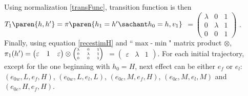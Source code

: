 Using normalization \ref{transFunc}, 
transition function is then 
$T_1 \paren{ h, h'} = \pi \paren{ h_1 = h' \sachant h_0 = h, v_1 }$ \tiny 
$=\begin{pmatrix} \lambda & 0 & 1 \\ 0 & \lambda & 1 \\ 0 & 0 & 1  \end{pmatrix}$ \normalsize.
Finally, using equation \ref{recestimH} 
and ``$\max$-$\min$" matrix product $\otimes$, 
$\pi_1(h') = \begin{pmatrix} \varepsilon & 1 & \varepsilon  \end{pmatrix}  
\otimes \tiny \begin{pmatrix} \lambda & 0 & 1 \\ 0 & \lambda & 1 \\ 0 & 0 & 1 \end{pmatrix}$ \normalsize $ 
= \begin{pmatrix} \varepsilon & \lambda & 1 \end{pmatrix} $.
For each initial trajectory, 
except for the one beginning with $h_0=H$, 
next effect can be either $e_f$ or $e_l$:
$(e_{0w},L,e_f,H)$, $(e_{0w},L,e_l,L)$, $(e_{0c},M,e_f,H)$, $(e_{0c},M,e_l,M)$ and $(e_{0c},H,e_f,H)$.

